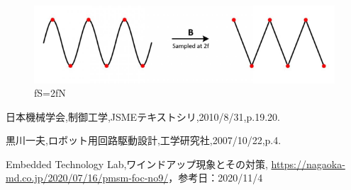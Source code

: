 \documentclass[xelatex,ja=standard,jafont=noto]{bxjsarticle}
\numberwithin{figure}{section}
\begin{document}
\begin{figure}[h!]
    \centering
    \includegraphics[scale=0.5]{018.png}
    \caption{fS=2fN}
\end{figure}



\newpage

\begin{thebibliography}{9}
日本機械学会,制御工学,JSMEテキストシリ,2010/8/31,p.19.20. 

黒川一夫,ロボット用回路駆動設計,工学研究社,2007/10/22,p.4. 


Embedded Technology Lab,ワインドアップ現象とその対策,
\url{https://nagaoka-md.co.jp/2020/07/16/pmsm-foc-no9/}，参考日：2020/11/4



\end{thebibliography}
\end{document}
